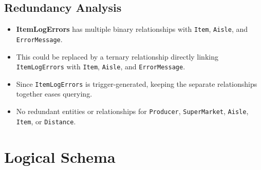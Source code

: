 \documentclass[a4paper,12pt]{article}
\begin{document}
\newpage
\subsection{Redundancy Analysis}

\begin{itemize}
    \item \textbf{ItemLogErrors} has multiple binary relationships with \texttt{Item}, \texttt{Aisle}, and \texttt{ErrorMessage}.
    \item This could be replaced by a ternary relationship directly linking \texttt{ItemLogErrors} with \texttt{Item}, \texttt{Aisle}, and \texttt{ErrorMessage}.
    \item Since \texttt{ItemLogErrors} is trigger-generated, keeping the separate relationships together eases querying.
    \item No redundant entities or relationships for \texttt{Producer}, \texttt{SuperMarket}, \texttt{Aisle}, \texttt{Item}, or \texttt{Distance}.
\end{itemize}

\newpage
\section{Logical Schema}
\end{document}
